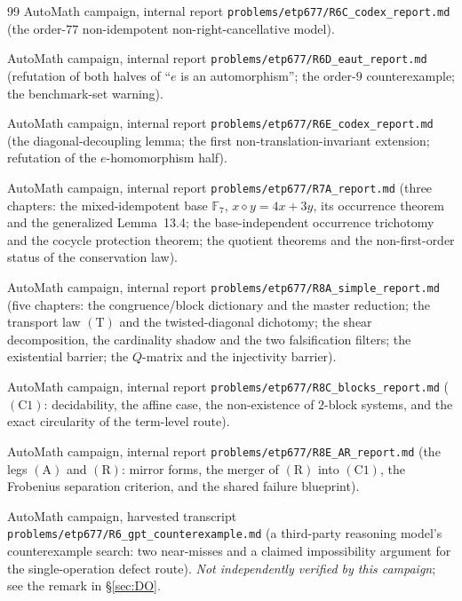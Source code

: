 \documentclass[11pt]{article}
\theoremstyle{plain}
\theoremstyle{definition}
\theoremstyle{remark}
\numberwithin{equation}{section}
\newcommand{\F}{\mathbb{F}}
\begin{document}
\begin{thebibliography}{99}
AutoMath campaign, internal report \texttt{problems\slash etp677\slash R6C\_codex\_report.md}
(the order-$77$ non-idempotent non-right-cancellative model).

AutoMath campaign, internal report \texttt{problems\slash etp677\slash R6D\_eaut\_report.md}
(refutation of both halves of ``$e$ is an automorphism''; the order-$9$
counterexample; the benchmark-set warning).

AutoMath campaign, internal report \texttt{problems\slash etp677\slash R6E\_codex\_report.md}
(the diagonal-decoupling lemma; the first non-translation-invariant extension;
refutation of the $e$-homomorphism half).

AutoMath campaign, internal report \texttt{problems\slash etp677\slash R7A\_report.md}
(three chapters: the mixed-idempotent base $\F_7$, $x\diamond y = 4x+3y$, its
occurrence theorem and the generalized Lemma~13.4; the base-independent occurrence
trichotomy and the cocycle protection theorem; the quotient theorems and the
non-first-order status of the conservation law).

AutoMath campaign, internal report \texttt{problems\slash etp677\slash R8A\_simple\_report.md}
(five chapters: the congruence/block dictionary and the master reduction; the
transport law $(\mathrm{T})$ and the twisted-diagonal dichotomy; the shear
decomposition, the cardinality shadow and the two falsification filters; the
existential barrier; the $Q$-matrix and the injectivity barrier).

AutoMath campaign, internal report \texttt{problems\slash etp677\slash R8C\_blocks\_report.md}
($(\mathrm{C1})$: decidability, the affine case, the non-existence of $2$-block
systems, and the exact circularity of the term-level route).

AutoMath campaign, internal report \texttt{problems\slash etp677\slash R8E\_AR\_report.md}
(the legs $(\mathrm{A})$ and $(\mathrm{R})$: mirror forms, the merger of
$(\mathrm{R})$ into $(\mathrm{C1})$, the Frobenius separation criterion, and the
shared failure blueprint).

AutoMath campaign, harvested transcript
\texttt{problems\slash etp677\slash R6\_gpt\_counterexample.md}
(a third-party reasoning model's counterexample search: two near-misses and a
claimed impossibility argument for the single-operation defect route).
\emph{Not independently verified by this campaign}; see the remark in
\S\ref{sec:DO}.


\end{thebibliography}
\end{document}
